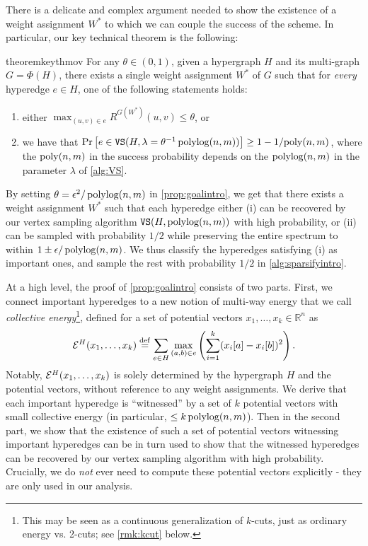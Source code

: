 \documentclass{article}
\begin{document}
There is a delicate and complex argument needed to show the existence
of a weight assignment $W^*$ to which we can couple the success of the scheme.
In particular, our key technical theorem is the following:

\begin{restatable}{theorem}{keythmov}
\label{prop:goalintro}
\label{prop:goal}
    For any $\theta \in (0,1)$, given a hypergraph
    $H$ and its multi-graph $G = \Phi(H)$,
    there exists a single weight assignment $W^*$ of $G$
    such that for \textit{every} hyperedge
    $e\in H$, one of the following statements holds:
    \begin{enumerate}[label=(\alph*)]
        \item either $\max_{(u,v)\in e} R^{G(W^*)}(u,v) \leq
            \theta$, or
        \item we have that $\mathrm{Pr}\left[ e\in \mathtt{VS}(H, \lambda = \theta^{-1}\operatorname{polylog}(n,m)) \right]
            \geq 1 - 1/\mathrm{poly}(n,m) $,
        where the $\mathrm{poly}(n,m)$ in the success probability depends
        on the $\operatorname{polylog}(n,m)$ in the parameter $\lambda$ of \cref{alg:VS}.
    \end{enumerate}
\end{restatable}

By setting $\theta = \epsilon^{2}/\operatorname{polylog}(n,m)$ in
\cref{prop:goalintro},
we get that there exists a weight assignment $W^*$ such that
each hyperedge either (i) can be recovered by our vertex sampling algorithm
$\mathtt{VS}(H,\operatorname{polylog}(n,m))$ with high probability, or (ii) can be sampled with probability
$1/2$ while preserving the entire spectrum to within $1\pm\epsilon/\operatorname{polylog}(n,m)$.
We thus classify the hyperedges satisfying (i) as important ones,
and sample the rest with probability $1/2$ in \cref{alg:sparsifyintro}.

At a high level, the proof of \cref{prop:goalintro} consists of two parts.
First, we connect important hyperedges
to a new notion of multi-way energy that we call
\textit{collective energy}\footnote{This may be seen as a continuous generalization
of $k$-cuts, just as ordinary energy vs. 2-cuts;
see \cref{rmk:kcut} below.}, defined for
a set of potential vectors $x_1,\ldots,x_k\in\mathbb{R}^{n}$ as
\begin{align}\label{eq:collectiveenergyearlyearly}
    \mathcal{E}^H(x_1,\ldots,x_k) \stackrel{\mathrm{def}}{=}
    \sum_{e\in H}
    \max_{(a,b)\in e}
    \left(
    \sum_{i=1}^{k} (x_i[a]-x_i[b])^2
    \right).
\end{align}
Notably, $\mathcal{E}^H(x_1,\ldots,x_k)$
is solely determined by the hypergraph $H$ and the potential vectors,
without reference to any weight assignments.
We derive that
each important hyperedge is ``witnessed'' by a set of $k$ potential
vectors with small collective energy (in particular, $\leq k\operatorname{polylog}(n,m)$).
Then in the second part,
we show that the existence of such a set of potential vectors
witnessing important hyperedges
can be in turn used to show that the witnessed
hyperedges can be recovered
by our vertex sampling algorithm with high probability.
Crucially, we do \textit{not} ever need to compute these potential vectors explicitly -
they are only used in our analysis.
\end{document}
